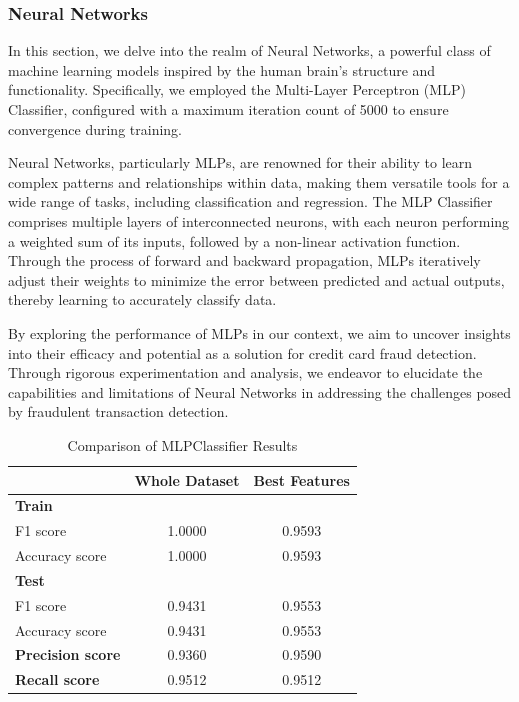 \documentclass[conference]{IEEEtran}
\begin{document}
\subsubsection{Neural Networks}

In this section, we delve into the realm of Neural Networks, a powerful class of machine learning models inspired by the human brain's structure and functionality. Specifically, we employed the Multi-Layer Perceptron (MLP) Classifier, configured with a maximum iteration count of 5000 to ensure convergence during training.

Neural Networks, particularly MLPs, are renowned for their ability to learn complex patterns and relationships within data, making them versatile tools for a wide range of tasks, including classification and regression. The MLP Classifier comprises multiple layers of interconnected neurons, with each neuron performing a weighted sum of its inputs, followed by a non-linear activation function. Through the process of forward and backward propagation, MLPs iteratively adjust their weights to minimize the error between predicted and actual outputs, thereby learning to accurately classify data.

By exploring the performance of MLPs in our context, we aim to uncover insights into their efficacy and potential as a solution for credit card fraud detection. Through rigorous experimentation and analysis, we endeavor to elucidate the capabilities and limitations of Neural Networks in addressing the challenges posed by fraudulent transaction detection.

\begin{table}[htbp]
\centering
\begin{tabular}{@{}lcc@{}}
\toprule
 & \textbf{Whole Dataset} & \textbf{Best Features} \\ \midrule
\textbf{Train} &  &  \\
\quad F1 score & 1.0000 & 0.9593 \\
\quad Accuracy score & 1.0000 & 0.9593 \\
\textbf{Test} &  &  \\
\quad F1 score & 0.9431 & 0.9553 \\
\quad Accuracy score & 0.9431 & 0.9553 \\
\textbf{Precision score} & 0.9360 & 0.9590 \\
\textbf{Recall score} & 0.9512 & 0.9512 \\ \bottomrule
\end{tabular}
\caption{Comparison of MLPClassifier Results}
\label{tab:mlpclassifier-comparison}
\end{table}
\end{document}
